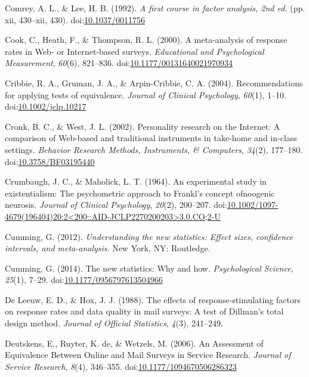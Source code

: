 \documentclass[english,man, mask]{apa6}
\theoremstyle{definition}
\theoremstyle{definition}
\theoremstyle{definition}
\theoremstyle{remark}
\begin{document}
\hypertarget{ref-Comrey1992}{}
Comrey, A. L., \& Lee, H. B. (1992). \emph{A first course in factor
analysis, 2nd ed.} (pp. xii, 430--xii, 430).
doi:\href{https://doi.org/10.1037/0011756}{10.1037/0011756}

\hypertarget{ref-Cook2000}{}
Cook, C., Heath, F., \& Thompson, R. L. (2000). A meta-analysis of
response rates in Web- or Internet-based surveys. \emph{Educational and
Psychological Measurement}, \emph{60}(6), 821--836.
doi:\href{https://doi.org/10.1177/00131640021970934}{10.1177/00131640021970934}

\hypertarget{ref-Cribbie2004}{}
Cribbie, R. A., Gruman, J. A., \& Arpin-Cribbie, C. A. (2004).
Recommendations for applying tests of equivalence. \emph{Journal of
Clinical Psychology}, \emph{60}(1), 1--10.
doi:\href{https://doi.org/10.1002/jclp.10217}{10.1002/jclp.10217}

\hypertarget{ref-Cronk2002}{}
Cronk, B. C., \& West, J. L. (2002). Personality research on the
Internet: A comparison of Web-based and traditional instruments in
take-home and in-class settings. \emph{Behavior Research Methods,
Instruments, \& Computers}, \emph{34}(2), 177--180.
doi:\href{https://doi.org/10.3758/BF03195440}{10.3758/BF03195440}

\hypertarget{ref-Crumbaugh1964}{}
Crumbaugh, J. C., \& Maholick, L. T. (1964). An experimental study in
existentialism: The psychometric approach to Frankl's concept ofnoogenic
neurosis. \emph{Journal of Clinical Psychology}, \emph{20}(2), 200--207.
doi:\href{https://doi.org/10.1002/1097-4679(196404)20:2\%3C200::AID-JCLP2270200203\%3E3.0.CO;2-U}{10.1002/1097-4679(196404)20:2\textless{}200::AID-JCLP2270200203\textgreater{}3.0.CO;2-U}

\hypertarget{ref-Cumming2012}{}
Cumming, G. (2012). \emph{Understanding the new statistics: Effect
sizes, confidence intervals, and meta-analysis}. New York, NY:
Routledge.

\hypertarget{ref-Cumming2014}{}
Cumming, G. (2014). The new statistics: Why and how. \emph{Psychological
Science}, \emph{25}(1), 7--29.
doi:\href{https://doi.org/10.1177/0956797613504966}{10.1177/0956797613504966}

\hypertarget{ref-DeLeeuw1988}{}
De Leeuw, E. D., \& Hox, J. J. (1988). The effects of
response-stimulating factors on response rates and data quality in mail
surveys: A test of Dillman's total design method. \emph{Journal of
Official Statistics}, \emph{4}(3), 241--249.

\hypertarget{ref-Deutskens2006}{}
Deutskens, E., Ruyter, K. de, \& Wetzels, M. (2006). An Assessment of
Equivalence Between Online and Mail Surveys in Service Research.
\emph{Journal of Service Research}, \emph{8}(4), 346--355.
doi:\href{https://doi.org/10.1177/1094670506286323}{10.1177/1094670506286323}
\end{document}
